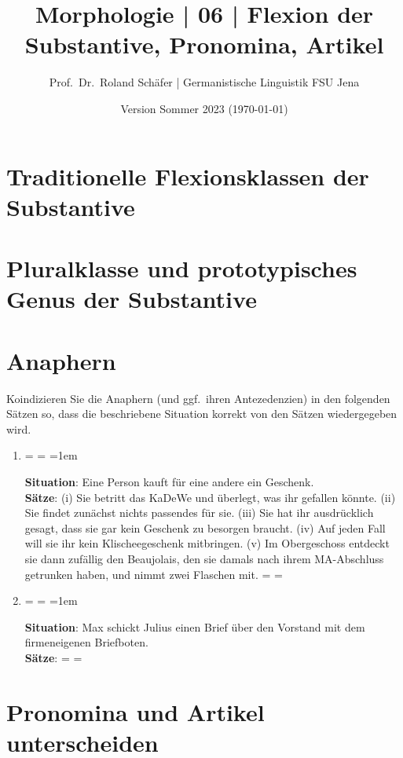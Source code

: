 \documentclass[12pt,a4paper,twoside]{article}
\author{Prof.\ Dr.\ Roland Schäfer | Germanistische Linguistik FSU Jena}
\title{Morphologie | 06 | Flexion der Substantive, Pronomina, Artikel}
\date{Version Sommer 2023 (\today)}
\newenvironment{spread}
{%
  \newdimen\origiwspc%
  \newdimen\origiwstr%
  \origiwspc=\fontdimen2\font%
  \origiwstr=\fontdimen3\font%
  \fontdimen2\font=1em%
  \doublespacing%
}{%
  \fontdimen2\font=\origiwspc%
  \fontdimen3\font=\origiwstr%
}
\begin{document}
\maketitle

\section{Traditionelle Flexionsklassen der Substantive}


\section{Pluralklasse und prototypisches Genus der Substantive}


\section{Anaphern}

Koindizieren Sie die Anaphern (und ggf.\ ihren Antezedenzien) in den folgenden Sätzen so, dass die beschriebene Situation korrekt von den Sätzen wiedergegeben wird.

\begin{enumerate}
  \item\doublespacing%
    \begin{spread}
      \textbf{Situation}: Eine Person kauft für eine andere ein Geschenk.\\
      \textbf{Sätze}: (i) Sie betritt das KaDeWe und überlegt, was ihr gefallen könnte.
      (ii) Sie findet zunächst nichts passendes für sie.
      (iii) Sie hat ihr ausdrücklich gesagt, dass sie gar kein Geschenk zu besorgen braucht.
      (iv) Auf jeden Fall will sie ihr kein Klischeegeschenk mitbringen.
      (v) Im Obergeschoss entdeckt sie dann zufällig den Beaujolais, den sie damals nach ihrem MA-Abschluss getrunken haben, und nimmt zwei Flaschen mit.\end{spread}
  \item\doublespacing
    \begin{spread}
      \textbf{Situation}: Max schickt Julius einen Brief über den Vorstand mit dem firmeneigenen Briefboten.\\
      \textbf{Sätze}: 
  \end{spread}
\end{enumerate}


\section{Pronomina und Artikel unterscheiden}
\end{document}
